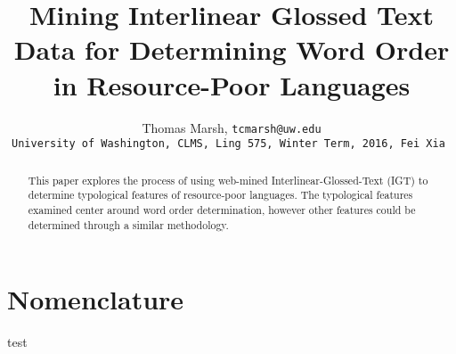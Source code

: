 \documentclass[]{aiaa-tc}
\title{Mining Interlinear Glossed Text Data for Determining Word Order in Resource-Poor Languages}
\author{
  Thomas Marsh, \tt{tcmarsh@uw.edu}\\ University of Washington, CLMS, Ling 575, Winter Term, 2016, Fei Xia
 }
\begin{document}
\maketitle

\begin{abstract}
This paper explores the process of using web-mined Interlinear-Glossed-Text (IGT) to determine typological features of resource-poor languages.  The typological features examined center around word order determination, however other features could be determined through a similar methodology.
\end{abstract}

\section{Nomenclature}

test
\end{document}
